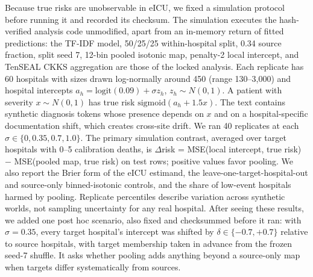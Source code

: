 \documentclass[11pt]{article}
\begin{document}
Because true risks are unobservable in eICU, we fixed a simulation protocol before running it and recorded its checksum. The simulation executes the hash-verified analysis code unmodified, apart from an in-memory return of fitted predictions: the TF-IDF model, 50/25/25 within-hospital split, 0.34 source fraction, split seed 7, 12-bin pooled isotonic map, penalty-2 local intercept, and TenSEAL CKKS aggregation are those of the locked analysis. Each replicate has 60 hospitals with sizes drawn log-normally around 450 (range 130--3,000) and hospital intercepts $a_h=\mathrm{logit}(0.09)+\sigma z_h$, $z_h\sim N(0,1)$. A patient with severity $x\sim N(0,1)$ has true risk $\mathrm{sigmoid}(a_h+1.5x)$. The text contains synthetic diagnosis tokens whose presence depends on $x$ and on a hospital-specific documentation shift, which creates cross-site drift. We ran 40 replicates at each $\sigma\in\{0,0.35,0.7,1.0\}$. The primary simulation contrast, averaged over target hospitals with 0--5 calibration deaths, is $\Delta$risk = MSE(local intercept, true risk) $-$ MSE(pooled map, true risk) on test rows; positive values favor pooling. We also report the Brier form of the eICU estimand, the leave-one-target-hospital-out and source-only binned-isotonic controls, and the share of low-event hospitals harmed by pooling. Replicate percentiles describe variation across synthetic worlds, not sampling uncertainty for any real hospital. After seeing these results, we added one post hoc scenario, also fixed and checksummed before it ran: with $\sigma=0.35$, every target hospital's intercept was shifted by $\delta\in\{-0.7,+0.7\}$ relative to source hospitals, with target membership taken in advance from the frozen seed-7 shuffle. It asks whether pooling adds anything beyond a source-only map when targets differ systematically from sources.
\end{document}
